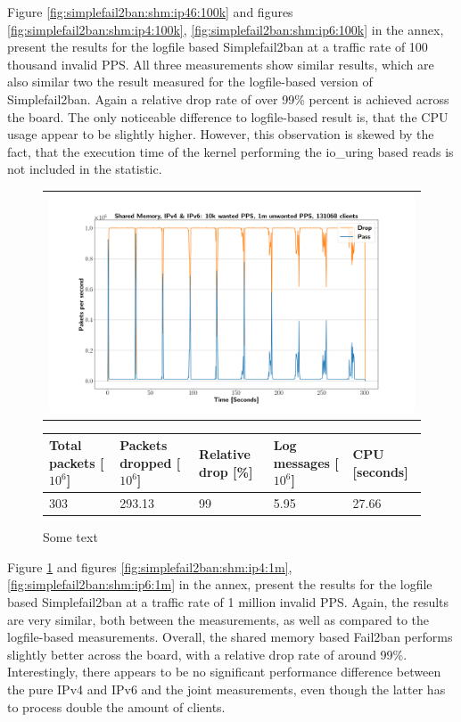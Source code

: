 Figure \ref{fig:simplefail2ban:shm:ip46:100k} and figures \ref{fig:simplefail2ban:shm:ip4:100k}, \ref{fig:simplefail2ban:shm:ip6:100k} in the annex, present the results
for the logfile based Simplefail2ban at a traffic rate of 100 thousand invalid \ac{PPS}. All three measurements show similar results, which are also similar two the result measured for the logfile-based
version of Simplefail2ban. Again a relative drop rate of over 99\% percent is achieved across the board. The only noticeable difference to logfile-based result is, that the \ac{CPU} usage appear to be slightly higher.
However, this observation is skewed by the fact, that the execution time of the kernel performing the io\_uring based reads is not included in the statistic. 

\begin{figure}[!h]
	\label{fig:simplefail2ban:shm:ip46:1m}
	\centering
	\scriptsize
	\begin{tabular}{c}
    	\centerline{\includegraphics[width=1.2\textwidth]{images/simplefail2ban_shm_ipv46_v10k_iv1m_c131068.png}}
	\end{tabular}
	\begin{tabular}{lllll}
		\toprule
		\textbf{Total packets [$10^6$]} & \textbf{Packets dropped [$10^6$]} & \textbf{Relative drop [\%]} & \textbf{Log messages [$10^6$]} & \textbf{CPU [seconds]} \\ \midrule 
		303 & 293.13 & 99 & 5.95 & 27.66 \\
		\bottomrule
	\end{tabular}
	\caption[Simplefail2ban, Shared Memory, IPv4 \& IPv6, 1m \ac{PPS}]{Some text}
\end{figure}

Figure \ref{fig:simplefail2ban:shm:ip46:1m} and figures \ref{fig:simplefail2ban:shm:ip4:1m}, \ref{fig:simplefail2ban:shm:ip6:1m} in the annex, present the results
for the logfile based Simplefail2ban at a traffic rate of 1 million invalid \ac{PPS}. Again, the results are very similar, both between the measurements, as well as compared to the logfile-based
measurements. Overall, the shared memory based Fail2ban performs slightly better across the board, with a relative drop rate of around 99\%. Interestingly, there appears 
to be no significant performance difference between the pure \ac{IPv4} and \ac{IPv6} and the joint measurements, even though
the latter has to process double the amount of clients.

